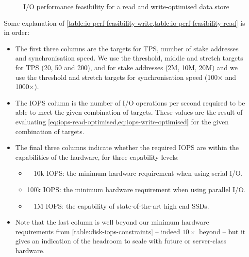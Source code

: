 \documentclass[11pt,a4paper]{article}
\begin{document}
\begin{figure}
\centering
{}
\caption{I/O performance feasibility for a read and write-optimised data store}
\label{fig:io-perf-feasibility}
\end{figure}

Some explanation of \cref{table:io-perf-feasibility-write,table:io-perf-feasibility-read} is in order:
\begin{itemize}
\item The first three columns are the targets for TPS, number of stake
      addresses and synchronisation speed. We use the threshold, middle and
      stretch targets for TPS (20, 50 and 200), and for stake addresses (2M,
      10M, 20M) and we use the threshold and stretch targets for
      synchronisation speed (100$\times$ and 1000$\times$).
\item The IOPS column is the number of I/O operations per second required to be
      able to meet the given combination of targets. These values are the
      result of evaluating \cref{eq:iops-read-optimised,eq:iops-write-optimised}
      for the given combination of targets.
\item The final three columns indicate whether the required IOPS are within the
      capabilities of the hardware, for three capability levels:
      \begin{itemize}
      \item ~~10k IOPS: the minimum hardware requirement when using serial I/O.
      \item 100k IOPS: the minimum hardware requirement when using parallel I/O.
      \item ~~1M IOPS: the capability of state-of-the-art high end SSDs.
      \end{itemize}
\item Note that the last column is well beyond our minimum hardware
      requirements from \cref{table:disk-iops-constraints} -- indeed $10\times$
      beyond -- but it gives an indication of the headroom to scale with future
      or server-class hardware.
\end{itemize}
\end{document}
